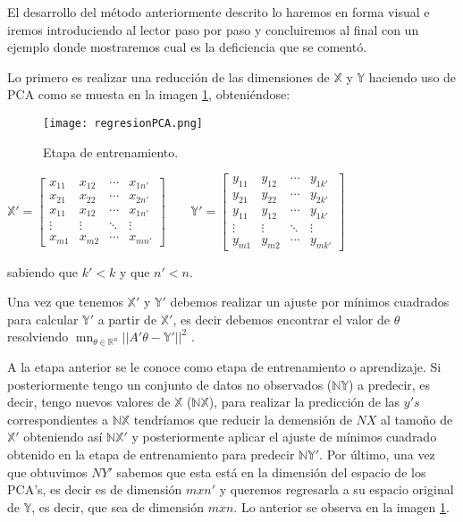 El desarrollo del método anteriormente descrito lo haremos en forma visual e iremos introduciendo al lector paso por paso y concluiremos al final con un ejemplo donde mostraremos cual es la deficiencia que se comentó.

Lo primero es realizar una reducción de las dimensiones de $\mathbb{X}$ y $\mathbb{Y}$ haciendo uso de PCA como se muesta en la imagen \ref{regresionPCA}, obteniéndose: 
 
\begin{figure}
\centering
\texttt{[image: regresionPCA.png]}
\caption{Etapa de entrenamiento.}\label{regresionPCA}
\end{figure}
 
$
\mathbb{X'} =
\begin{bmatrix}
 x_{11} & x_{12} & \cdots & x_{1n'} \\
 x_{21} & x_{22} & \cdots & x_{2n'} \\
 x_{11} & x_{12} & \cdots & x_{1n'} \\
 \vdots & \vdots & \ddots & \vdots \\
 x_{m1} & x_{m2} & \cdots & x_{mn'}	
\end{bmatrix} 
\qquad
\mathbb{Y'} =
\begin{bmatrix}
 y_{11} & y_{12} & \cdots & y_{1k'} \\
 y_{21} & y_{22} & \cdots & y_{2k'} \\
 y_{11} & y_{12} & \cdots & y_{1k'} \\
 \vdots & \vdots & \ddots & \vdots \\
 y_{m1} & y_{m2} & \cdots & y_{mk'}	
\end{bmatrix} $ 

sabiendo que $k' < k$ y que $n' < n$. 

Una vez que tenemos $\mathbb{X'}$ y $\mathbb{Y'}$ debemos realizar un ajuste por mínimos cuadrados para calcular $\mathbb{Y'}$ a partir de $\mathbb{X'}$, es decir debemos encontrar el valor de $\theta$ resolviendo $\mathop{m\acute{i}n}_{\theta \in \mathbb{R}^{n}} ||A'\theta - \mathbb{Y'}||^{2}$ .

A la etapa anterior se le conoce como etapa de entrenamiento o aprendizaje. Si posteriormente tengo un conjunto de datos no observados ($\mathbb{NY}$) a predecir, es decir, tengo nuevos valores de $\mathbb{X}$ ($\mathbb{NX}$), para realizar la predicción de las $y's$ correspondientes a $\mathbb{NX}$ tendríamos que reducir la demensión de $NX$ al tamoño de $\mathbb{X'}$ obteniendo así $\mathbb{NX'}$ y posteriormente aplicar el ajuste de mínimos cuadrado obtenido en la etapa de entrenamiento para predecir $\mathbb{NY'}$. Por último, una vez que obtuvimos $NY'$ sabemos que esta está en la dimensión del espacio de los PCA's, es decir es de dimensión $m x n'$ y queremos regresarla a su espacio original de $\mathbb{Y}$, es decir, que sea de dimensión $m x n$. Lo anterior se observa en la imagen \ref{regresionPCA}.

